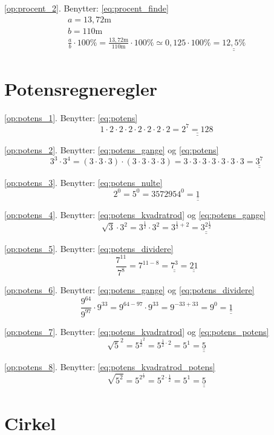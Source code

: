 \documentclass[11pt,a5paper,fleqn,leqno]{book}
\begin{document}
\ref{op:procent_2}. Benytter: \eqref{eq:procent_finde} \\
\begin{displaymath}\begin{array}{l}
a = 13,72 \text{m} \\
b = 110 \text{m} \\
\frac{a}{b} \cdot 100\% = \frac{13,72 \text{m}}{110 \text{m}} \cdot 100\% \simeq 0,125 \cdot 100\% = \underline{\underline{12,5\%}}
\end{array}\end{displaymath}

\section{Potensregneregler}

\ref{op:potens_1}. Benytter: \eqref{eq:potens}
\[1 \cdot 2 \cdot 2 \cdot 2 \cdot 2 \cdot 2 \cdot 2 \cdot 2 = \underline{\underline{2^7 = 128}}\]

\ref{op:potens_2}. Benytter: \eqref{eq:potens_gange} og \eqref{eq:potens}
\[3^3 \cdot 3^4 = (3 \cdot 3 \cdot 3) \cdot (3 \cdot 3 \cdot 3 \cdot 3) = 3 \cdot 3 \cdot 3 \cdot 3 \cdot 3 \cdot 3 \cdot 3 = \underline{\underline{3^7}}\]

\ref{op:potens_3}. Benytter: \eqref{eq:potens_nulte}
\[2^0 = 5^0 = 3572954^0 = \underline{\underline{1}}\]

\ref{op:potens_4}. Benytter: \eqref{eq:potens_kvadratrod} og \eqref{eq:potens_gange}
\[\sqrt{3} \cdot 3^2 = 3^{\frac{1}{2}} \cdot 3^2 = 3^{\frac{1}{2}+2} = \underline{\underline{3^{2\frac{1}{2}}}}\]

\ref{op:potens_5}. Benytter: \eqref{eq:potens_dividere}
\[\dfrac{7^{11}}{7^8} = 7^{11-8} = \underline{\underline{7^3}} = \underline{\underline{21}}\]

\ref{op:potens_6}. Benytter: \eqref{eq:potens_gange} og \eqref{eq:potens_dividere}
\[\dfrac{9^{64}}{9^{97}} \cdot 9^{33} = 9^{64-97} \cdot 9^{33} = 9^{-33+33} = 9^{0} = \underline{\underline{1}}\]

\ref{op:potens_7}. Benytter: \eqref{eq:potens_kvadratrod} og \eqref{eq:potens_potens}
\[\sqrt{5}^2 = 5^{\frac{1}{2}^2} = 5^{\frac{1}{2} \cdot 2} = 5^1 = \underline{\underline{5}}\]

\ref{op:potens_8}. Benytter: \eqref{eq:potens_kvadratrod_potens}
\[\sqrt{5^2} = 5^{2^{\frac{1}{2}}} = 5^{2 \cdot \frac{1}{2}} = 5^1 = \underline{\underline{5}}\]

\section{Cirkel}
\end{document}
